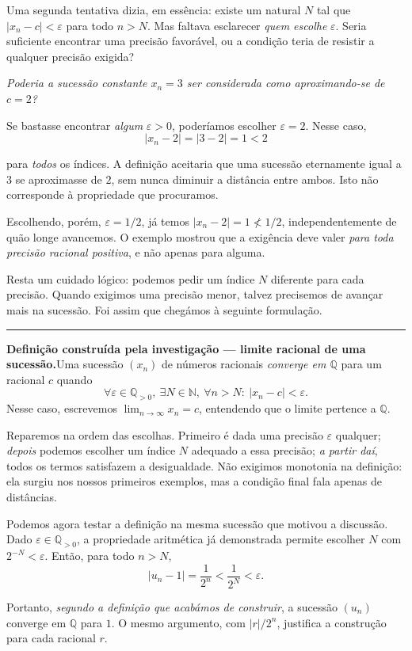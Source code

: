 \documentclass[11pt,a4paper]{article}
\newcommand{\Q}{\mathbb{Q}}
\newcommand{\N}{\mathbb{N}}
\newcommand{\questao}[1]{\par\medskip\noindent\textit{#1}\par\smallskip}
\newcommand{\assentado}[2]{%
\par\medskip\noindent\begingroup\color{azul}\rule{\linewidth}{0.45pt}\par\smallskip
\noindent\textbf{#1.}\enspace #2\par\endgroup\medskip}
\begin{document}
Uma segunda tentativa dizia, em essência: existe um natural $N$ tal que $|x_n-c|<\varepsilon$ para todo $n>N$. Mas faltava esclarecer \emph{quem escolhe} $\varepsilon$. Seria suficiente encontrar uma precisão favorável, ou a condição teria de resistir a qualquer precisão exigida?

\questao{Poderia a sucessão constante $x_n=3$ ser considerada como aproximando-se de $c=2$?}

Se bastasse encontrar \emph{algum} $\varepsilon>0$, poderíamos escolher $\varepsilon=2$. Nesse caso,
\[
 |x_n-2|=|3-2|=1<2
\]

para \emph{todos} os índices. A definição aceitaria que uma sucessão eternamente igual a $3$ se aproximasse de $2$, sem nunca diminuir a distância entre ambos. Isto não corresponde à propriedade que procuramos.

Escolhendo, porém, $\varepsilon=1/2$, já temos $|x_n-2|=1\not<1/2$, independentemente de quão longe avancemos. O exemplo mostrou que a exigência deve valer \emph{para toda precisão racional positiva}, e não apenas para alguma.

Resta um cuidado lógico: podemos pedir um índice $N$ diferente para cada precisão. Quando exigimos uma precisão menor, talvez precisemos de avançar mais na sucessão. Foi assim que chegámos à seguinte formulação.

\assentado{Definição construída pela investigação --- limite racional de uma sucessão}{Uma sucessão $(x_n)$ de números racionais \emph{converge em $\Q$} para um racional $c$ quando
\[
 \boxed{\forall\varepsilon\in\Q_{>0},\ \exists N\in\N,\ \forall n>N:\ |x_n-c|<\varepsilon.}
\]
Nesse caso, escrevemos $\displaystyle\lim_{n\to\infty}x_n=c$, entendendo que o limite pertence a $\Q$.}

Reparemos na ordem das escolhas. Primeiro é dada uma precisão $\varepsilon$ qualquer; \emph{depois} podemos escolher um índice $N$ adequado a essa precisão; \emph{a partir daí}, todos os termos satisfazem a desigualdade. Não exigimos monotonia na definição: ela surgiu nos nossos primeiros exemplos, mas a condição final fala apenas de distâncias.

Podemos agora testar a definição na mesma sucessão que motivou a discussão. Dado $\varepsilon\in\Q_{>0}$, a propriedade aritmética já demonstrada permite escolher $N$ com $2^{-N}<\varepsilon$. Então, para todo $n>N$,
\[
 |u_n-1|=\frac1{2^n}<\frac1{2^N}<\varepsilon.
\]

Portanto, \emph{segundo a definição que acabámos de construir}, a sucessão $(u_n)$ converge em $\Q$ para $1$. O mesmo argumento, com $|r|/2^n$, justifica a construção para cada racional $r$.
\end{document}
